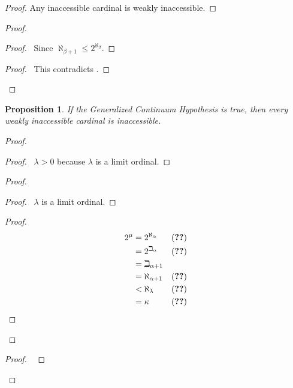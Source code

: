 \documentclass{book}
\let\qed\relax
\newtheorem{prop}[ax]{Proposition}
\theoremstyle{definition}
\begin{document}
\begin{proof}
Any inaccessible cardinal is weakly inaccessible.
\end{proof}

\begin{proof}
\pf
{}
\begin{proof}
	\pf\ Since $\aleph_{\beta + 1} \leq 2^{\aleph_\beta}$.
\end{proof}
\qedstep
\begin{proof}
\pf\ This contradicts .
\end{proof}
\qed
\end{proof}

\begin{prop}
If the Generalized Continuum Hypothesis is true, then every weakly inaccessible cardinal is inaccessible.
\end{prop}

\begin{proof}
\pf
{}
\begin{proof}
	\pf\ $\lambda > 0$ because $\lambda$ is a limit ordinal.
\end{proof}
\begin{proof}
	\begin{proof}
		\pf\ $\lambda$ is a limit ordinal.
	\end{proof}
	\begin{proof}
		\pf
		\begin{align*}
			2^\mu & = 2^{\aleph_\alpha} & (\text{\stepref{b}})  \\
			& = 2^{\beth_\alpha} & (\text{\stepref{1}}) \\
			& = \beth_{\alpha + 1} \\
			& = \aleph_{\alpha + 1} & (\text{\stepref{1}}) \\
			& < \aleph_\lambda & (\text{\stepref{d}}) \\
			& = \kappa & (\text{\stepref{2}})
		\end{align*}
	\end{proof}
\end{proof}
\begin{proof}
	\pf\ 
\end{proof}
\qed
\end{proof}
\end{document}
